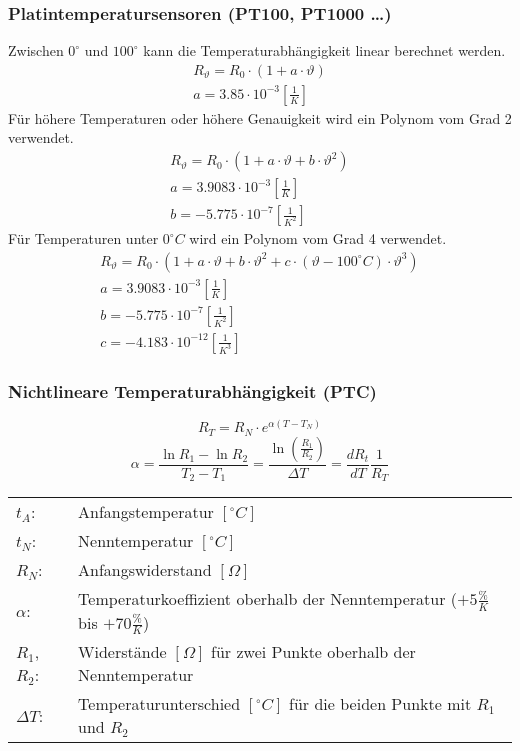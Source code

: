 \subsubsection{Platintemperatursensoren (PT100, PT1000 \dots)}
Zwischen $0^\circ$ und $100^\circ$ kann die Temperaturabhängigkeit linear 
berechnet werden. 
\[ \begin{array}{l}
R_\vartheta = R_0 \cdot (1 + a \cdot \vartheta) \\
a = 3.85 \cdot 10^{-3} \left[\frac{1}{K}\right] 
\end{array} \]
%
Für höhere Temperaturen oder höhere Genauigkeit wird ein Polynom vom Grad 2 
verwendet. 
\[ \begin{array}{l}
R_\vartheta = R_0 \cdot (1 + a \cdot \vartheta + b \cdot \vartheta^2) \\
a = 3.9083 \cdot 10^{-3} \left[\frac{1}{K}\right] \\
b = -5.775 \cdot 10^{-7} \left[\frac{1}{K^2}\right] 
\end{array} \]
%
Für Temperaturen unter $0^\circ C$ wird ein Polynom vom Grad 4 verwendet. 
\[ \begin{array}{l}
R_\vartheta = R_0 \cdot (1 + a \cdot \vartheta + b \cdot \vartheta^2 
+ c \cdot (\vartheta - 100^\circ C) \cdot \vartheta^3) \\
a = 3.9083 \cdot 10^{-3} \left[\frac{1}{K}\right] \\
b = -5.775 \cdot 10^{-7} \left[\frac{1}{K^2}\right] \\
c = -4.183 \cdot 10^{-12} \left[\frac{1}{K^3}\right] 
\end{array} \]


\subsubsection{Nichtlineare Temperaturabhängigkeit (PTC)}
\[ R_T = R_N \cdot e^{\alpha (T - T_N)} \]
\[ \alpha = \frac{\ln R_1 - \ln R_2}{T_2 - T_1} 
= \frac{\ln\left(\frac{R_1}{R_2}\right)}{\Delta T} 
= \frac{d R_t}{d T}\frac{1}{R_T} \]
\begin{tabular}{@{}lp{}}
  $t_A$:        & Anfangstemperatur $[^\circ C]$ \\
  $t_N$:        & Nenntemperatur $[^\circ C]$ \\
  $R_N$:        & Anfangswiderstand $[\Omega]$ \\
  $\alpha$:     & Temperaturkoeffizient oberhalb der Nenntemperatur 
                  ($+5\frac{\%}{K}$ bis $+70\frac{\%}{K}$) \\
  $R_1$, $R_2$: & Widerstände $[\Omega]$ für zwei Punkte oberhalb der 
                  Nenntemperatur \\
  $\Delta T$:   & Temperaturunterschied $[^\circ C]$ für die beiden Punkte mit 
                  $R_1$ und $R_2$
\end{tabular}

